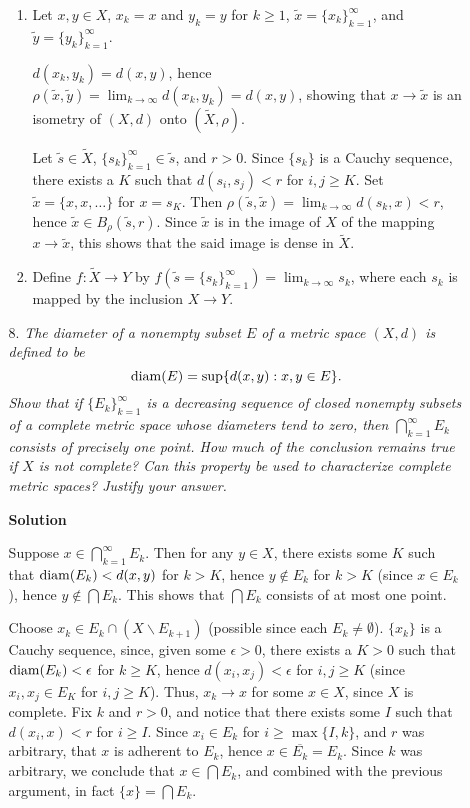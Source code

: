 \documentclass{article}
\def\diam{\mathop{\rm diam}\nolimits}
\begin{document}
\begin{enumerate}
\begin{itemize}
\begin{enumerate}
\item Let \(x,y \in X\), \(x_k = x\) and \(y_k = y\) for \(k \geq 1\), \(\tilde{x} = \{x_k\}_{k = 1}^{\infty}\), and \(\tilde{y} = \{y_k\}_{k = 1}^{\infty}\).

\(d(x_k,y_k) = d(x,y)\), hence \(\rho(\tilde{x}, \tilde{y}) = \lim_{k \to \infty} d(x_k,y_k) = d(x,y)\), showing that \(x \to \tilde{x}\) is an isometry of \((X,d)\) onto \((\tilde{X}, \rho)\).

Let \(\tilde{s} \in \tilde{X}\), \(\{s_k\}_{k = 1}^{\infty} \in \tilde{s}\), and \(r > 0\).  Since \(\{s_k\}\) is a Cauchy sequence, there exists a \(K\) such that \(d(s_i,s_j) < r\) for \(i,j \geq K\).  Set \(\tilde{x} = \{x, x, \ldots\}\) for \(x = s_K\).  Then \(\rho(\tilde{s}, \tilde{x}) = \lim_{k \to \infty} d(s_k,x) < r\), hence \(\tilde{x} \in B_{\rho}(\tilde{s},r)\).  Since \(\tilde{x}\) is in the image of \(X\) of the mapping \(x \to \tilde{x}\), this shows that the said image is dense in \(\tilde{X}\).

\item Define \(f : \tilde{X} \to Y\) by \(f \left( \tilde{s} = \{s_k\}_{k = 1}^{\infty} \right) = \lim_{k \to \infty} s_k\), where each \(s_k\) is mapped by the inclusion \(X \to Y\).

\end{enumerate}



\item[8.] {\em The {\em diameter} of a nonempty subset \(E\) of a metric space \((X,d)\) is defined to be
\[\diam(E) = \sup \{d(x,y) : x,y \in E\}.\]
Show that if \(\{E_k\}_{k = 1}^{\infty}\) is a decreasing sequence of closed nonempty subsets of a complete metric space whose diameters tend to zero, then \(\bigcap_{k = 1}^{\infty} E_k\) consists of precisely one point.  How much of the conclusion remains true if \(X\) is not complete?  Can this property be used to characterize complete metric spaces?  Justify your answer.}

{\bf Solution}

Suppose \(x \in \bigcap_{k = 1}^{\infty} E_k\).  Then for any \(y \in X\), there exists some \(K\) such that \(\diam(E_k) < d(x,y)\) for \(k > K\), hence \(y \notin E_k\) for \(k > K\) (since \(x \in E_k\)), hence \(y \notin \bigcap E_k\).  This shows that \(\bigcap E_k\) consists of at most one point.

Choose \(x_k \in E_k \cap (X \backslash E_{k + 1})\) (possible since each \(E_k \neq \emptyset\)).  \(\{x_k\}\) is a Cauchy sequence, since, given some \(\epsilon > 0\), there exists a \(K > 0\) such that \(\diam(E_k) < \epsilon\) for \(k \geq K\), hence \(d(x_i,x_j) < \epsilon\) for \(i,j \geq K\) (since \(x_i,x_j \in E_K\) for \(i,j \geq K\)).  Thus, \(x_k \to x\) for some \(x \in X\), since \(X\) is complete.  Fix \(k\) and \(r > 0\), and notice that there exists some \(I\) such that \(d(x_i,x) < r\) for \(i \geq I\).  Since \(x_i \in E_k\) for \(i \geq \max \{I, k\}\), and \(r\) was arbitrary, that \(x\) is adherent to \(E_k\), hence \(x \in \overline{E_k} = E_k\).  Since \(k\) was arbitrary, we conclude that \(x \in \bigcap E_k\), and combined with the previous argument, in fact \(\{x\} = \bigcap E_k\).


\end{itemize}
\end{enumerate}
\end{document}

